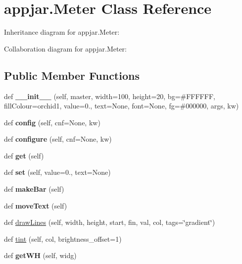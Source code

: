 \hypertarget{classappjar_1_1_meter}{}\section{appjar.\+Meter Class Reference}
\label{classappjar_1_1_meter}


Inheritance diagram for appjar.\+Meter\+:


Collaboration diagram for appjar.\+Meter\+:
\subsection*{Public Member Functions}
\begin{DoxyCompactItemize}
\item 
\mbox{\label{classappjar_1_1_meter_a76f8f3da0603b9399d9d98589e5e7d5c}} 
def {\bfseries \+\_\+\+\_\+init\+\_\+\+\_\+} (self, master, width=100, height=20, bg=\textquotesingle{}\#F\+F\+F\+F\+FF\textquotesingle{}, fill\+Colour=\textquotesingle{}orchid1\textquotesingle{}, value=0., text=None, font=None, fg=\textquotesingle{}\#000000\textquotesingle{}, args, kw)
\item 
\mbox{\label{classappjar_1_1_meter_a8ef7480686bdc67cdc332df6aab1a5e7}} 
def {\bfseries config} (self, cnf=None, kw)
\item 
\mbox{\label{classappjar_1_1_meter_a66f4d73150e4e4a3c3c0a888d3af1116}} 
def {\bfseries configure} (self, cnf=None, kw)
\item 
\mbox{\label{classappjar_1_1_meter_accdcb3ab58ffe06d50243f2ab6704856}} 
def {\bfseries get} (self)
\item 
\mbox{\label{classappjar_1_1_meter_a131dab75e070f3037222618ffc0663eb}} 
def {\bfseries set} (self, value=0., text=None)
\item 
\mbox{\label{classappjar_1_1_meter_a20d583be42407d66b4f8b77cf38b097e}} 
def {\bfseries make\+Bar} (self)
\item 
\mbox{\label{classappjar_1_1_meter_a82bd62c6042a4a64e52e5b6c750bdc7a}} 
def {\bfseries move\+Text} (self)
\item 
def \hyperlink{classappjar_1_1_meter_aed84a0393db00b8b2c15817c2e372915}{draw\+Lines} (self, width, height, start, fin, val, col, tags=\char`\"{}gradient\char`\"{})
\item 
def \hyperlink{classappjar_1_1_meter_aa197eb97f4f48e43d13cd224ae8a9aa0}{tint} (self, col, brightness\+\_\+offset=1)
\item 
\mbox{\label{classappjar_1_1_meter_a0139f6f20208c54bb82e68bcdcd19e36}} 
def {\bfseries get\+WH} (self, widg)
\end{DoxyCompactItemize}


